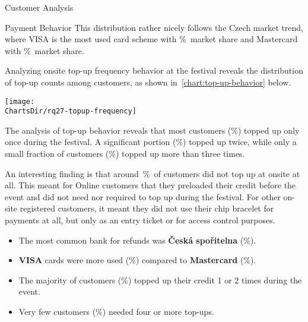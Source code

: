 \begin{section}{Customer Analysis}
\begin{subsection}{Payment Behavior}
		This distribution rather nicely follows the Czech market trend, where VISA is the most used card scheme with \%~market share and Mastercard with \%~market share\cite{spbk_czech_profil_karty}.

		\pagebreak[4]


		Analyzing onsite top-up frequency behavior at the festival reveals the distribution of top-up counts among customers, as shown in~\autoref{chart:top-up-behavior} below.

		\begin{chart}[h]
			\centering
			\texttt{[image: \\ChartsDir/rq27-topup-frequency]}
			\caption{ Top-up Behavior Analysis}
			\label{chart:top-up-behavior}
			\source
		\end{chart}

		The analysis of top-up behavior reveals that most customers (\%) topped up only once during the festival.
		A significant portion (\%) topped up twice, while only a small fraction of customers (\%) topped up more than three times.

		An interesting finding is that around~\%~of customers did not top up at onsite at all.
		This meant for Online customers that they preloaded their credit before the event and did not need nor required to top up during the festival.
		For other on-site registered customers, it meant they did not use their chip bracelet for payments at all, but only as an entry ticket or for access control purposes.

		\begin{keytakeaways}
			\begin{itemize}
				\item The most common bank for refunds was \textbf{Česká spořitelna} (\%).
				\item \textbf{VISA} cards were more used (\%) compared to \textbf{Mastercard} (\%).
				\item The majority of customers (\%) topped up their credit 1 or 2 times during the event.
				\item Very few customers (\%) needed four or more top-ups.
			\end{itemize}
		\end{keytakeaways}
	\end{subsection}


\end{section}
